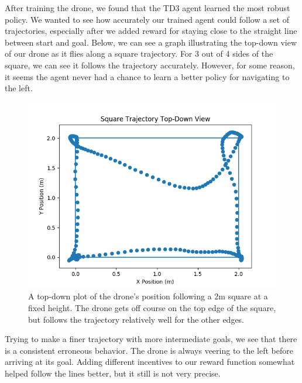 After training the drone, we found that the TD3 agent learned the most robust policy. We wanted to see how accurately our trained agent could follow a set of trajectories, especially after we added reward for staying close to the straight line between start and goal. Below, we can see a graph illustrating the top-down view of our drone as it flies along a square trajectory. For 3 out of 4 sides of the square, we can see it follows the trajectory accurately. However, for some reason, it seems the agent never had a chance to learn a better policy for navigating to the left.


\begin{figure}[H]
    \centering
    \includegraphics[width = 1\textwidth]{img/square.png}
    \caption{A top-down plot of the drone's position following a 2m square at a fixed height. The drone gets off course on the top edge of the square, but follows the trajectory relatively well for the other edges.}
    \label{fig:square}
\end{figure}

Trying to make a finer trajectory with more intermediate goals, we see that there is a consistent erroneous behavior. The drone is always veering to the left before arriving at its goal. Adding different incentives to our reward function somewhat helped follow the lines better, but it still is not very precise.

